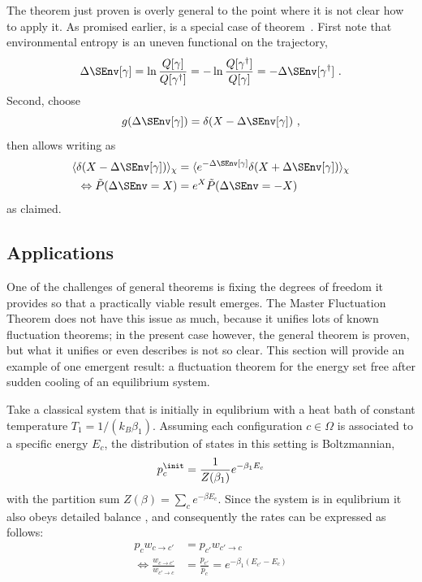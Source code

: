The theorem just proven is overly general to the point where it is not clear how to apply it. As promised earlier,  is a special case of theorem~. First note that environmental entropy is an uneven functional on the trajectory,
\begin{equation}
	  \Delta\SEnv[\gamma]
	= \ln\frac{Q[\gamma]}{Q[\gamma^\dagger]}
	= -\ln\frac{Q[\gamma^\dagger]}{Q[\gamma]}
	= -\Delta\SEnv[\gamma^\dagger] ~.
\end{equation}
%
Second, choose
\begin{equation}
	g(\Delta\SEnv[\gamma]) = \delta(X - \Delta\SEnv[\gamma]) ~,
\end{equation}
%
then  allows writing  as
%
\begin{align*}
		\langle \delta(X - \Delta\SEnv[\gamma])\rangle_\chi
		&=
		\langle e^{-\Delta\SEnv[\gamma]}\delta(X + \Delta\SEnv[\gamma])\rangle_\chi
	\\ \Leftrightarrow
		\tilde P(\Delta\SEnv = X)
		&=
		e^X \tilde P(\Delta\SEnv = -X)
\end{align*}
%
as claimed.





\subsection{Applications}

One of the challenges of general theorems is fixing the degrees of freedom it provides so that a practically viable result emerges. The Master Fluctuation Theorem \cite{seifert-review} does not have this issue as much, because it unifies lots of known fluctuation theorems; in the present case however, the general theorem is proven, but what it unifies or even describes is not so clear. This section will provide an example of one emergent result: a fluctuation theorem for the energy set free after sudden cooling of an equilibrium system.

Take a classical system that is initially in equlibrium with a heat bath of constant temperature \(T_1 = 1/(k_B\beta_1)\). Assuming each configuration \(c\in\Omega\) is associated to a specific energy \(E_c\), the distribution of states in this setting is Boltzmannian,
%
\begin{equation}
	p_c^\init = \frac1{Z(\beta_1)}e^{-\beta_1E_c}
\end{equation}
%
with the partition sum \(Z(\beta) = \sum_ce^{-\beta E_c}\). Since the system is in equlibrium it also obeys detailed balance , and consequently the rates can be expressed as follows:
%
\begin{align}
	p_c w_{c\to c'} &= p_{c'} w_{c'\to c}
	\\
	\Leftrightarrow
		   \frac{w_{c\to c'}}{w_{c'\to c}}
		&= \frac{p_{c'}}{p_c}
		 = e^{-\beta_1(E_{c'}-E_c)}
\end{align}

